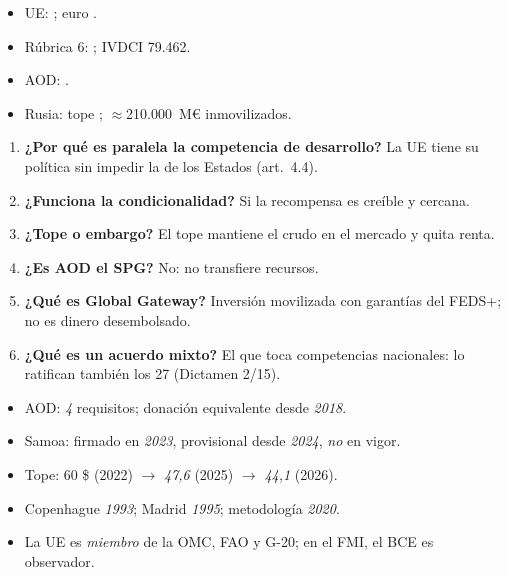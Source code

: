 \documentclass{article}
\begin{document}
\begin{columnas}
\anexorepaso
{}
\begin{itemize}
\item UE: ; euro .
\item Rúbrica 6: ; IVDCI 79.462.
\item AOD: .
\item Rusia: tope ; $\approx$210.000~M€ inmovilizados.
\end{itemize}
\begin{enumerate}
\item \textbf{¿Por qué es paralela la competencia de desarrollo?} La UE tiene su política sin impedir la de los Estados (art.~4.4).
\item \textbf{¿Funciona la condicionalidad?} Si la recompensa es creíble y cercana.
\item \textbf{¿Tope o embargo?} El tope mantiene el crudo en el mercado y quita renta.
\item \textbf{¿Es AOD el SPG?} No: no transfiere recursos.
\item \textbf{¿Qué es Global Gateway?} Inversión movilizada con garantías del FEDS+; no es dinero desembolsado.
\item \textbf{¿Qué es un acuerdo mixto?} El que toca competencias nacionales: lo ratifican también los 27 (Dictamen 2/15).
\end{enumerate}
\begin{trampa}
\begin{itemize}
\item AOD: \emph{4} requisitos; donación equivalente desde \emph{2018}.
\item Samoa: firmado en \emph{2023}, provisional desde \emph{2024}, \emph{no} en vigor.
\item Tope: 60 \$ (2022) $\to$ \emph{47,6} (2025) $\to$ \emph{44,1} (2026).
\item Copenhague \emph{1993}; Madrid \emph{1995}; metodología \emph{2020}.
\item La UE es \emph{miembro} de la OMC, FAO y G-20; en el FMI, el BCE es observador.
\end{itemize}
\end{trampa}

\end{columnas}
\end{document}
